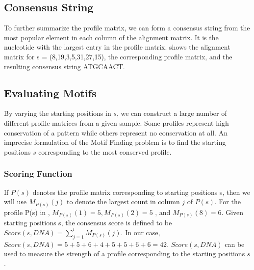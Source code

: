 \subsection{Consensus String}
To further summarize the profile matrix, we can form a consensus string from the most popular element in each column of the alignment matrix. It is the nucleotide with the largest entry in the profile matrix.  shows the alignment matrix for s = (8,19,3,5,31,27,15), the corresponding profile matrix, and the resulting
consensus string ATGCAACT.

\subsection{Evaluating Motifs}
By varying the starting positions in $ s $, we can construct a large number of
different profile matrices from a given sample. Some profiles represent high conservation of a pattern while others represent no conservation at all. An imprecise formulation of the Motif Finding problem is to find the starting positions $ s $ corresponding to the most conserved profile. 

\subsubsection{Scoring Function}
If $ P(s) $ denotes the profile matrix corresponding to starting positions s, then
we will use $ M_{P(s)}(j) $ to denote the largest count in column $ j $ of $ P(s) $. For the profile P(s) in , $ M_{P(s)}(1) = 5, M_{P(s)}(2) = 5$ , and  $ M_{P(s)}(8) = 6 $. Given starting positions s, the consensus score is defined to be $ Score(s, DNA) = \sum_{j=1}^{l}M_{P(s)}(j) $. In our case, $ Score(s, DNA) =
5 + 5 + 6 + 4 + 5 + 5 + 6 + 6 = 42 $. $  Score(s, DNA) $ can be used to measure the strength of a profile corresponding to the starting positions $ s $.

